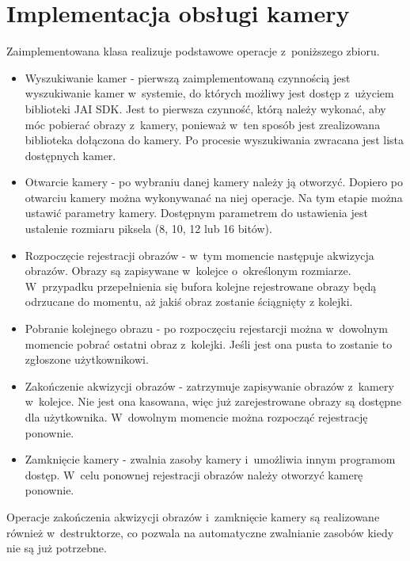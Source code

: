\section{Implementacja obsługi kamery}
\label{sec:implementacjaKamery}

Zaimplementowana klasa realizuje podstawowe operacje z~poniższego zbioru. 
\begin{itemize}
\item Wyszukiwanie kamer - pierwszą zaimplementowaną czynnością jest wyszukiwanie kamer w~systemie, do których możliwy jest dostęp z~użyciem biblioteki JAI SDK. Jest to pierwsza czynność, którą należy wykonać, aby móc pobierać obrazy z~kamery, ponieważ w~ten sposób jest zrealizowana biblioteka dołączona do kamery. Po procesie wyszukiwania zwracana jest lista dostępnych kamer.
\item Otwarcie kamery - po wybraniu danej kamery należy ją otworzyć. Dopiero po otwarciu kamery można wykonywanać na niej operacje. Na tym etapie można ustawić parametry kamery. Dostępnym parametrem do ustawienia jest ustalenie rozmiaru piksela (8, 10, 12 lub 16 bitów).
\item Rozpoczęcie rejestracji obrazów - w~tym momencie następuje akwizycja obrazów. Obrazy są zapisywane w~kolejce o~określonym rozmiarze. W~przypadku przepełnienia się bufora kolejne rejestrowane obrazy będą odrzucane do momentu, aż jakiś obraz zostanie ściągnięty z kolejki.
\item Pobranie kolejnego obrazu - po rozpoczęciu rejestarcji można w~dowolnym momencie pobrać ostatni obraz z~kolejki. Jeśli jest ona pusta to zostanie to zgłoszone użytkownikowi.
\item Zakończenie akwizycji obrazów - zatrzymuje zapisywanie obrazów z~kamery w~kolejce. Nie jest ona kasowana, więc już zarejestrowane obrazy są dostępne dla użytkownika. W~dowolnym momencie można rozpocząć rejestrację ponownie.
\item Zamknięcie kamery - zwalnia zasoby kamery i~umożliwia innym programom dostęp. W~celu ponownej rejestracji obrazów należy otworzyć kamerę ponownie.
\end{itemize}
Operacje zakończenia akwizycji obrazów i~zamknięcie kamery są realizowane również w~destruktorze, co pozwala na automatyczne zwalnianie zasobów kiedy nie są już potrzebne.